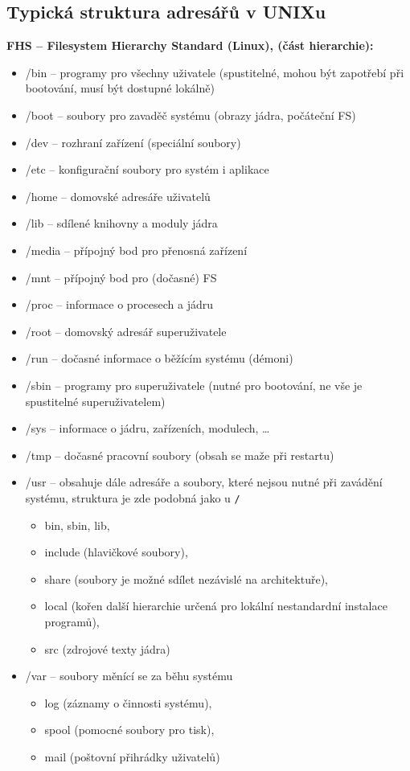 \documentclass[a4paper, 11pt]{article}
\newcommand{\tcmd}[1]{\texttt{#1}}
\begin{document}
\subsection{Typická struktura adresářů v UNIXu}
\textbf{FHS -- Filesystem Hierarchy Standard (Linux), (část hierarchie):}
\begin{itemize}
    \item /bin -- programy pro všechny uživatele (spustitelné, mohou být zapotřebí při bootování, musí být dostupné lokálně)
    \item /boot -- soubory pro zavaděč systému (obrazy jádra, počáteční FS)
    \item /dev -- rozhraní zařízení (speciální soubory)
    \item /etc -- konfigurační soubory pro systém i aplikace
    \item /home -- domovské adresáře uživatelů
    \item /lib -- sdílené knihovny a moduly jádra
    \item /media -- přípojný bod pro přenosná zařízení
    \item /mnt -- přípojný bod pro (dočasné) FS
    \item /proc -- informace o procesech a jádru
    \item /root -- domovský adresář superuživatele
    \item /run -- dočasné informace o běžícím systému (démoni)
    \item /sbin -- programy pro superuživatele (nutné pro bootování, ne vše je spustitelné superuživatelem)
    \item /sys -- informace o jádru, zařízeních, modulech, \ldots
    \item /tmp -- dočasné pracovní soubory (obsah se maže při restartu)
    \item /usr -- obsahuje dále adresáře a soubory, které nejsou nutné při zavádění systému, struktura je zde podobná jako u \tcmd{/}
    \begin{itemize}
        \item bin, sbin, lib,
        \item include (hlavičkové soubory),
        \item share (soubory je možné sdílet nezávislé na architektuře),
        \item local (kořen další hierarchie určená pro lokální nestandardní instalace programů),
        \item src (zdrojové texty jádra)
    \end{itemize}
    \item /var -- soubory měnící se za běhu systému
    \begin{itemize}
        \item log (záznamy o činnosti systému), 
        \item spool (pomocné soubory pro tisk),
        \item mail (poštovní přihrádky uživatelů)
    \end{itemize}
\end{itemize}
\end{document}
